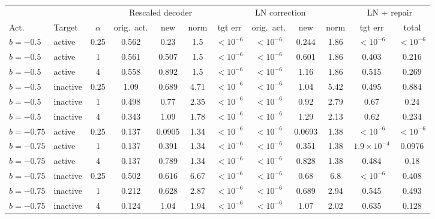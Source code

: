 \begin{tabular}{llc|ccc|cccc|cc}
\toprule
 & & & \multicolumn{3}{c|}{Rescaled decoder} & \multicolumn{4}{c|}{LN correction} & \multicolumn{2}{c}{LN + repair} \\
Act. & Target & $\alpha$ & orig.\ act. & new & norm & tgt err & orig.\ act. & new & norm & tgt err & total \\
\midrule
$b{=}{-}0.5$ & active & 0.25 & 0.562 & 0.23 & 1.5 & $<\!10^{-6}$ & $<\!10^{-6}$ & 0.244 & 1.86 & $<\!10^{-6}$ & $<\!10^{-6}$ \\
$b{=}{-}0.5$ & active & 1 & 0.561 & 0.507 & 1.5 & $<\!10^{-6}$ & $<\!10^{-6}$ & 0.601 & 1.86 & 0.403 & 0.216 \\
$b{=}{-}0.5$ & active & 4 & 0.558 & 0.892 & 1.5 & $<\!10^{-6}$ & $<\!10^{-6}$ & 1.16 & 1.86 & 0.515 & 0.269 \\
$b{=}{-}0.5$ & inactive & 0.25 & 1.09 & 0.689 & 4.71 & $<\!10^{-6}$ & $<\!10^{-6}$ & 1.04 & 5.42 & 0.495 & 0.884 \\
$b{=}{-}0.5$ & inactive & 1 & 0.498 & 0.77 & 2.35 & $<\!10^{-6}$ & $<\!10^{-6}$ & 0.92 & 2.79 & 0.67 & 0.24 \\
$b{=}{-}0.5$ & inactive & 4 & 0.343 & 1.09 & 1.78 & $<\!10^{-6}$ & $<\!10^{-6}$ & 1.29 & 2.13 & 0.62 & 0.234 \\
\midrule
$b{=}{-}0.75$ & active & 0.25 & 0.137 & 0.0905 & 1.34 & $<\!10^{-6}$ & $<\!10^{-6}$ & 0.0693 & 1.38 & $<\!10^{-6}$ & $<\!10^{-6}$ \\
$b{=}{-}0.75$ & active & 1 & 0.137 & 0.391 & 1.34 & $<\!10^{-6}$ & $<\!10^{-6}$ & 0.351 & 1.38 & $1.9\times10^{-4}$ & 0.0976 \\
$b{=}{-}0.75$ & active & 4 & 0.137 & 0.789 & 1.34 & $<\!10^{-6}$ & $<\!10^{-6}$ & 0.828 & 1.38 & 0.484 & 0.18 \\
$b{=}{-}0.75$ & inactive & 0.25 & 0.502 & 0.616 & 6.67 & $<\!10^{-6}$ & $<\!10^{-6}$ & 0.68 & 6.8 & $<\!10^{-6}$ & 0.408 \\
$b{=}{-}0.75$ & inactive & 1 & 0.212 & 0.628 & 2.87 & $<\!10^{-6}$ & $<\!10^{-6}$ & 0.689 & 2.94 & 0.545 & 0.493 \\
$b{=}{-}0.75$ & inactive & 4 & 0.124 & 1.04 & 1.94 & $<\!10^{-6}$ & $<\!10^{-6}$ & 1.07 & 2.02 & 0.635 & 0.128 \\
\bottomrule
\end{tabular}
